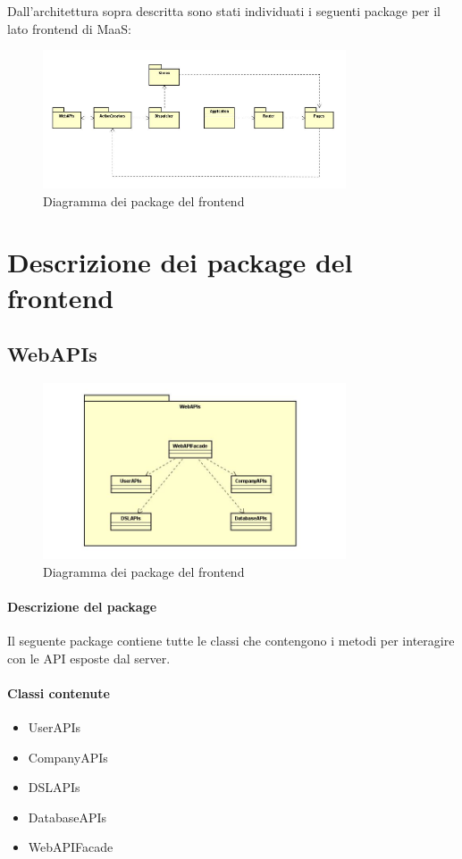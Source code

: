 Dall'architettura sopra descritta sono stati individuati i seguenti package per il lato frontend di MaaS:

\begin{figure}[h]
\centering
\includegraphics[width=0.8\textwidth]{res/sections/imgs/packages-diagram.jpg}
\caption{Diagramma dei package del frontend}
\end{figure}

\section{Descrizione dei package del frontend}
\subsection{WebAPIs}

\begin{figure}[h]
\centering
\includegraphics[width=0.8\textwidth]{res/sections/imgs/webapi-diagram.jpg}
\caption{Diagramma dei package del frontend}
\end{figure}

\paragraph*{Descrizione del package}
Il seguente package contiene tutte le classi che contengono i metodi per interagire con le API esposte dal server. 
\paragraph*{Classi contenute}
\begin{itemize}
\item UserAPIs
\item CompanyAPIs
\item DSLAPIs
\item DatabaseAPIs
\item WebAPIFacade
\end{itemize}

